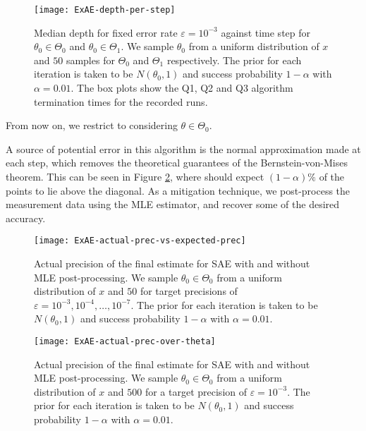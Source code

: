 \begin{figure}[htbp]
	\centering
	\texttt{[image: ExAE-depth-per-step]}
	\caption{Median depth for fixed error rate $\varepsilon = 10^{-3}$ against time step for $\theta_0 \in \Theta_0$ and $\theta_0 \in \Theta_1$. We sample $\theta_0$ from a uniform distribution of $x$ and $50$ samples for $\Theta_0$ and $ \Theta_1$ respectively. The prior for each iteration is taken to be $N(\theta_0, 1)$ and success probability $1 - \alpha$ with $\alpha = 0.01$. The box plots show the Q1, Q2 and Q3 algorithm termination times for the recorded runs.}
	\label{fig::ExAE-depth-per-step}
\end{figure}

From now on, we restrict to considering $\theta \in \Theta_0$.

A source of potential error in this algorithm is the normal approximation made at each step, which removes the theoretical guarantees of the Bernstein-von-Mises theorem. This can be seen in Figure \ref{fig::ExAE-actual-prec-vs-expected-prec}, where should expect $(1-\alpha)\%$ of the points to lie above the diagonal. As a mitigation technique, we post-process the measurement data using the MLE estimator, and recover some of the desired accuracy.

\begin{figure}[htbp]
	\centering
	\texttt{[image: ExAE-actual-prec-vs-expected-prec]}
	\caption{Actual precision of the final estimate for SAE with and without MLE post-processing. We sample $\theta_0 \in \Theta_0$ from a uniform distribution of $x$ and $50$ for target precisions of $\varepsilon = 10^{-3}, 10^{-4}, \ldots, 10^{-7} $. The prior for each iteration is taken to be $N(\theta_0, 1)$ and success probability $1 - \alpha$ with $\alpha = 0.01$.}
	\label{fig::ExAE-actual-prec-vs-expected-prec}
\end{figure}

\begin{figure}[htbp]
	\centering
	\texttt{[image: ExAE-actual-prec-over-theta]}
	\caption{Actual precision of the final estimate for SAE with and without MLE post-processing. We sample $\theta_0 \in \Theta_0$ from a uniform distribution of $x$ and $500$ for a target precision of $\varepsilon = 10^{-3}$. The prior for each iteration is taken to be $N(\theta_0, 1)$ and success probability $1 - \alpha$ with $\alpha = 0.01$.}
	\label{fig::ExAE-actual-prec-over-theta}
\end{figure}


